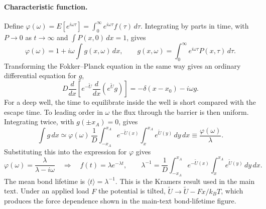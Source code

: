 \paragraph{Characteristic function.} Define $\varphi(\omega)=E[e^{i\omega\tau}]=\int_0^\infty e^{i\omega\tau}f(\tau)\,d\tau$. Integrating by parts in time, with $P\to0$ as $t\to\infty$ and $\int P(x,0)\,dx=1$, gives
\begin{equation}
\varphi(\omega)=1+i\omega\int g(x,\omega)\,dx,\qquad g(x,\omega)=\int_0^\infty e^{i\omega\tau}P(x,\tau)\,d\tau .
\end{equation}
Transforming the Fokker--Planck equation in the same way gives an ordinary differential equation for $g$,
\begin{equation}
D\frac{d}{dx}\left[e^{-\tilde U}\frac{d}{dx}\left(e^{\tilde U}g\right)\right]=-\delta(x-x_0)-i\omega g .
\end{equation}
For a deep well, the time to equilibrate inside the well is short compared with the escape time. To leading order in $\omega$ the flux through the barrier is then uniform. Integrating twice, with $g(\pm x_A)=0$, gives
\begin{equation}
\int g\,dx\simeq \varphi(\omega)\,\frac{1}{D}\int_{-x_A}^{x_A}e^{-\tilde U(x)}\int_x^{x_A}e^{\tilde U(y)}\,dy\,dx \equiv \frac{\varphi(\omega)}{\lambda}.
\end{equation}
Substituting this into the expression for $\varphi$ gives
\begin{equation}
\varphi(\omega)=\frac{\lambda}{\lambda-i\omega}\quad\Longrightarrow\quad f(t)=\lambda e^{-\lambda t},\qquad
\lambda^{-1}=\frac{1}{D}\int_{-x_A}^{x_A}e^{-\tilde U(x)}\int_x^{x_A}e^{\tilde U(y)}\,dy\,dx .
\end{equation}
The mean bond lifetime is $\langle t\rangle=\lambda^{-1}$. This is the Kramers result\cite{kramers1940brownian,zwanzig2001nonequilibrium} used in the main text. Under an applied load $F$ the potential is tilted, $\tilde U\to\tilde U-Fx/k_BT$, which produces the force dependence shown in the main-text bond-lifetime figure.


